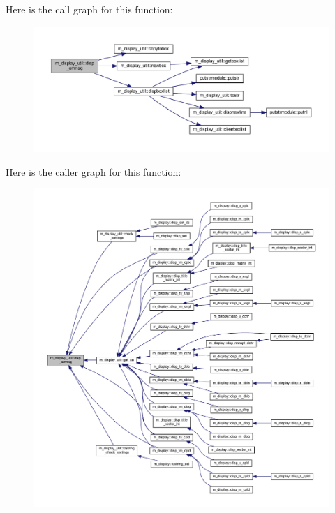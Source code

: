 Here is the call graph for this function\+:
\nopagebreak
\begin{figure}[H]
\begin{center}
\leavevmode
\includegraphics[width=350pt]{namespacem__display__util_a6bfbf2a614c2b0e059d5399eb8dda479_cgraph}
\end{center}
\end{figure}
Here is the caller graph for this function\+:
\nopagebreak
\begin{figure}[H]
\begin{center}
\leavevmode
\includegraphics[width=350pt]{namespacem__display__util_a6bfbf2a614c2b0e059d5399eb8dda479_icgraph}
\end{center}
\end{figure}
\mbox{\label{namespacem__display__util_af04928d07a7f716a0098c44bdd7ec3fd}} 

